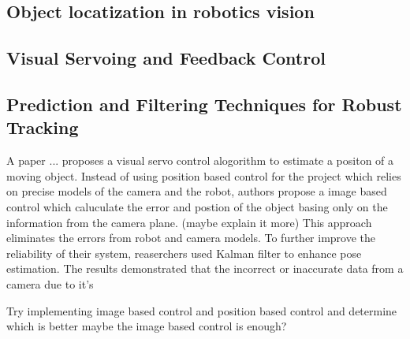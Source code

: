 \subsection{Object locatization in robotics vision}

\subsection{Visual Servoing and Feedback Control}

\subsection{Prediction and Filtering Techniques for Robust Tracking}
A paper ... proposes a visual servo control alogorithm to estimate a positon of
a moving object. Instead of using position based control for the project which relies on
precise models of the camera and the robot, authors propose a image based control which
caluculate the error and postion of the object basing only on the information from the camera
plane. (maybe explain it more) This approach eliminates the errors from robot and camera models.
To further improve the reliability of their system, reaserchers used Kalman filter to
enhance pose estimation. The results demonstrated that the incorrect or inaccurate data
from a camera due to it's 

Try implementing image based control and position based control and determine which is better
maybe the image based control is enough?